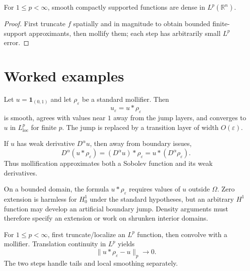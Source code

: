 \begin{theorem}\label{thm:iii22-03}
For $1\le p<\infty$, smooth compactly supported functions are dense in $L^p(\mathbb R^n)$.
\begin{proof}
First truncate $f$ spatially and in magnitude to obtain bounded finite-support approximants, then mollify them; each step has arbitrarily small $L^p$ error.
\end{proof}
\end{theorem}

\section{Worked examples}

\begin{example}\label{ex:iii22-worked-01}
Let \(u=\mathbf1_{(0,1)}\) and let \(\rho_\varepsilon\) be a standard
mollifier. Then
\[
u_\varepsilon=u*\rho_\varepsilon
\]
is smooth, agrees with values near \(1\) away from the jump layers, and
converges to \(u\) in \(L^p_{\mathrm{loc}}\) for finite \(p\). The jump is
replaced by a transition layer of width \(O(\varepsilon)\).
\end{example}

\begin{example}\label{ex:iii22-worked-02}
If \(u\) has weak derivative \(D^\alpha u\), then away from boundary
issues,
\[
D^\alpha(u*\rho_\varepsilon)
=(D^\alpha u)*\rho_\varepsilon
=u*(D^\alpha\rho_\varepsilon).
\]
Thus mollification approximates both a Sobolev function and its weak
derivatives.
\end{example}

\begin{example}\label{ex:iii22-worked-03}
On a bounded domain, the formula \(u*\rho_\varepsilon\) requires values of
\(u\) outside \(\Omega\). Zero extension is harmless for \(H_0^1\) under the
standard hypotheses, but an arbitrary \(H^1\) function may develop an
artificial boundary jump. Density arguments must therefore specify an
extension or work on shrunken interior domains.
\end{example}

\begin{example}\label{ex:iii22-worked-04}
For \(1\le p<\infty\), first truncate/localize an \(L^p\) function, then
convolve with a mollifier. Translation continuity in \(L^p\) yields
\[
\|u*\rho_\varepsilon-u\|_p\to0.
\]
The two steps handle tails and local smoothing separately.
\end{example}

